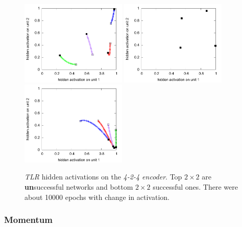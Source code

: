 \begin{figure}[H]
  \includegraphics[width=0.45\textwidth]{img/hid-tlr-good-tiny.pdf}  
  \includegraphics[width=0.45\textwidth]{img/hid-tlr-good-init.pdf}  
  \includegraphics[width=0.45\textwidth]{img/hid-tlr-good-weird.pdf}  
  \caption{\emph{TLR} hidden activations on the \emph{4-2-4 encoder}. Top $2\times2$ are {\bf un}successful networks and bottom $2\times2$ successful ones. There were about 10000 epochs with change in activation.}
  \label{fig:results-hidden-activations-tlr}
\end{figure}

\subsubsection{Momentum}
\label{sec:results-momentum} 

